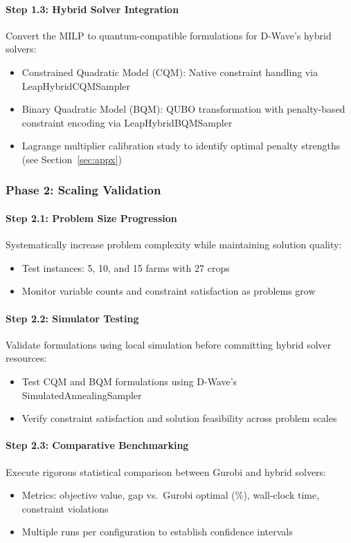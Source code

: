 \documentclass{oqireport}
\begin{document}
\paragraph{Step 1.3: Hybrid Solver Integration}
Convert the MILP to quantum-compatible formulations for D-Wave's hybrid solvers:
\begin{itemize}
    \item Constrained Quadratic Model (CQM): Native constraint handling via LeapHybridCQMSampler
    \item Binary Quadratic Model (BQM): QUBO transformation with penalty-based constraint encoding via LeapHybridBQMSampler
    \item Lagrange multiplier calibration study to identify optimal penalty strengths (see Section~\ref{sec:appx})
\end{itemize}

\subsubsection{Phase 2: Scaling Validation}

\paragraph{Step 2.1: Problem Size Progression}
Systematically increase problem complexity while maintaining solution quality:
\begin{itemize}
    \item Test instances: 5, 10, and 15 farms with 27 crops
    \item Monitor variable counts and constraint satisfaction as problems grow
\end{itemize}

\paragraph{Step 2.2: Simulator Testing}
Validate formulations using local simulation before committing hybrid solver resources:
\begin{itemize}
    \item Test CQM and BQM formulations using D-Wave's SimulatedAnnealingSampler
    \item Verify constraint satisfaction and solution feasibility across problem scales
\end{itemize}

\paragraph{Step 2.3: Comparative Benchmarking}
Execute rigorous statistical comparison between Gurobi and hybrid solvers:
\begin{itemize}
    \item Metrics: objective value, gap vs.\ Gurobi optimal (\%), wall-clock time, constraint violations
    \item Multiple runs per configuration to establish confidence intervals
\end{itemize}
\end{document}
